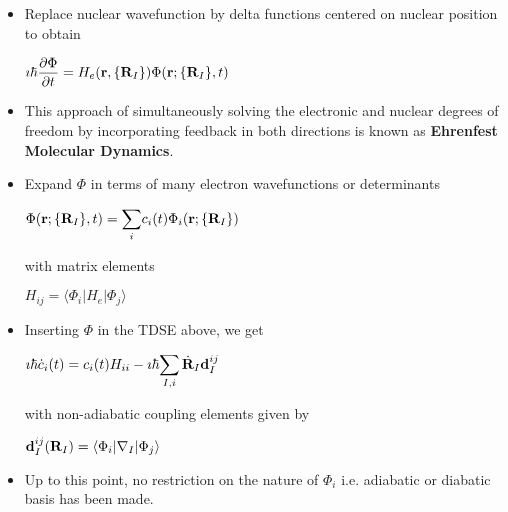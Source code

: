 \documentclass[slidestop,mathserif,compress,xcolor=svgnames]{beamer}
\begin{document}
\begin{frame}[allowframebreaks]
  \begin{itemize}
  \item Replace nuclear wavefunction by delta functions centered on nuclear position to obtain
    \begin{center}
      $\imath\hbar\dfrac{\partial\Phi}{\partial t} = H_e({\bf r},\{{\bf R}_I\})\Phi({\bf r};\{{\bf R}_I\},t)$
    \end{center}
  \item This approach of simultaneously solving the electronic and nuclear degrees of freedom by incorporating feedback in both directions is known as \textbf{Ehrenfest Molecular Dynamics}.
  \item Expand $\Phi$ in terms of many electron wavefunctions or  determinants
    \begin{center}
      $\Phi({\bf r};\{{\bf R}_I\},t) = \displaystyle{\sum_i} c_i(t)\Phi_i({\bf r};\{{\bf R}_I\})$
    \end{center}
    with matrix elements
    \begin{center}
      $H_{ij} = \langle\Phi_i|H_e|\Phi_j\rangle$
    \end{center} 
  \item Inserting $\Phi$ in the TDSE above, we get
    \begin{center}
      $\imath\hbar\dot{c}_i(t) = c_i(t)H_{ii} -\imath\hbar\displaystyle{\sum_{I,i} \dot{\bf R}_I{\bf d}^{ij}_I}$
    \end{center}
    with non-adiabatic coupling elements given by
    \begin{center}
      ${\bf d}^{ij}_I({\bf R}_I) = \langle\Phi_i|\nabla_I|\Phi_j\rangle$
    \end{center}
  \item Up to this point, no restriction on the nature of $\Phi_i$ i.e. adiabatic or diabatic basis has been made. 
  \end{itemize}
\end{frame}
\end{document}
